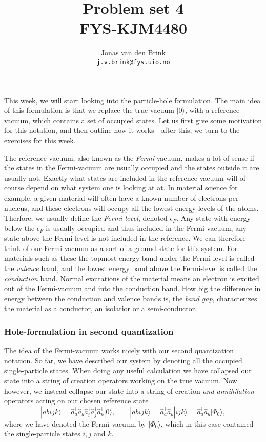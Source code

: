 \documentclass[a4paper, 11pt, notitlepage, english]{article}
\author{Jonas van den Brink \\ \texttt{j.v.brink@fys.uio.no}}
\title{Problem set 4 \\ FYS-KJM4480}
\newcommand{\ket}[1]{|#1 \rangle}
\newcommand{\op}[1]{\hat{#1}}
\newcommand{\eps}{\epsilon}
\begin{document}
\maketitle

This week, we will start looking into the particle-hole formulation. The main idea of this formulation is that we replace the true vacuum $\ket{0}$, with a reference vacuum, which contains a set of occupied states. Let us first give some motivation for this notation, and then outline how it works---after this, we turn to the exercises for this week.

The reference vacuum, also known as the \emph{Fermi}-vacuum, makes a lot of sense if the states in the Fermi-vacuum are usually occupied and the states outside it are usually not. Exactly what states are included in the reference vacuum will of course depend on what system one is looking at at. In material science for example, a given material will often have a known number of electrons per nucleus, and these electrons will occupy all the lowest energy-levels of the atoms. Therfore, we usually define the \emph{Fermi-level}, denoted $\eps_F$. Any state with energy below the $\eps_F$ is usually occupied and thus included in the Fermi-vacuum, any state above the Fermi-level is not included in the reference. We can therefore think of our Fermi-vacuum as a sort of a ground state for this system. For materials such as these the topmost energy band under the Fermi-level is called the \emph{valence} band, and the lowest energy band above the Fermi-level is called the \emph{conduction} band. Normal excitations of the material means an electron is excited out of the Fermi-vacuum and into the conduction band. How big the difference in energy between the conduction and valence bands is, the \emph{band gap}, characterizes the material as a conductor, an isolatior or a semi-conductor. 

\subsubsection*{Hole-formulation in second quantization}

The idea of the Fermi-vacuum works nicely with our second quantization notation. So far, we have described our system by denoting all the occupied single-particle states. When doing any useful calculation we have collapsed our state into a string of creation operators working on the true vacuum. Now however, we instead collapse our state into a string of creation \emph{and annihilation} operators acting on our chosen reference state
$$\ket{abijk} = \op{a}_a^\dag\op{a}_b^\dag\op{a}_i^\dag\op{a}_j^\dag\op{a}_k^\dag\ket{0}, \qquad \ket{abijk} = \op{a}_a^\dag\op{a}_b^\dag\ket{ijk} = \op{a}_a^\dag\op{a}_b^\dag\ket{\Phi_0},$$
where we have denoted the Fermi-vacuum by $\ket{\Phi_0}$, which in this case contained the single-particle states $i, j$ and $k$.
\end{document}
